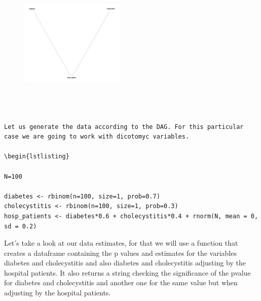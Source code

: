 \documentclass{article}
\begin{document}
\begin{figure}[h]
\includegraphics[width=5cm]{BERKS_DAG.png} %
\centering
\end{figure}
\begin{lstlisting}



Let us generate the data according to the DAG. For this particular case we are going to work with dicotomyc variables.

\begin{lstlisting}

N=100

diabetes <- rbinom(n=100, size=1, prob=0.7)
cholecystitis <- rbinom(n=100, size=1, prob=0.3) 
hosp_patients <- diabetes*0.6 + cholecystitis*0.4 + rnorm(N, mean = 0, sd = 0.2)

\end{lstlisting}


Let's take a look at our data estimates, for that we will use a function that creates a dataframe containing the p values and estimates for the variables diabetes and cholecystitis and also diabetes and cholecystitis adjusting by the hospital patients. It also returns a string checking the  significance of the pvalue for diabetes and cholecystitis and another one for the same value but when adjusting by the hospital patients.
\end{document}
